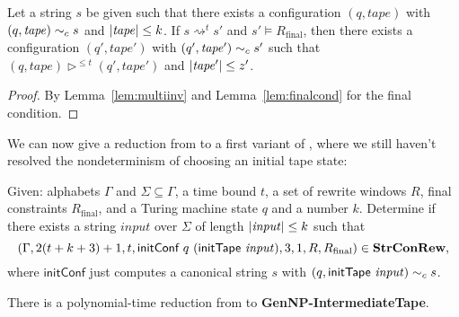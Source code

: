 \documentclass[a4paper,UKenglish,cleveref, autoref]{lipics-v2019}
\newcommand{\TODO}[1]{\ifthenelse{\isundefined{\showTODOs}}{}{\colorbox{red}{\LARGE TODO}:#1}}
\newcommand{\strent}{\rightsquigarrow}
\newcommand{\Rfinal}{R_{\text{final}}}
\begin{document}
  

\begin{theorem}[Soundness]\label{thm:simsound}
  Let a string $s$ be given such that there exists a configuration $(q, \mathit{tape})$ with $(q, \mathit{tape}) \sim_c{} s$ and $|\mathit{tape}| \le k$. If $s \strent^t s'$ and $s' \models \Rfinal$, then there exists a configuration $(q', \mathit{tape}')$ with $(q', \mathit{tape}') \sim_c{} s'$ such that $(q, \mathit{tape}) \rhd^{\le t} (q', \mathit{tape}')$ and $|\mathit{tape}'| \le z'$. 
\end{theorem}
\begin{proof}
  By Lemma~\ref{lem:multiinv} and Lemma~\ref{lem:finalcond} for the final condition.
\end{proof}

We can now give a reduction from \gennp{} to a first variant of \strconrew{}, where we still haven't resolved the nondeterminism of choosing an initial tape state:
\begin{definition}\label{def:gennpinter}
  Given: alphabets $\Gamma$ and $\Sigma \subseteq \Gamma$, a time bound $t$, a set of rewrite windows $R$, final constraints $\Rfinal$, and a Turing machine state $q$ and a number $k$. 
  Determine if there exists a string $\mathit{input}$ over $\Sigma$ of length $|\mathit{input}| \le k$ such that 
  \[(\Gamma, 2 (t + k + 3) + 1, t, \textsf{initConf}~q~(\textsf{initTape}~\mathit{input}), 3, 1, R, \Rfinal) \in \strconrew{},\]
  where $\textsf{initConf}$ just computes a canonical string $s$ with $(q, \textsf{initTape}~\mathit{input}) \sim_c{} s$. 
\end{definition}
\begin{theorem}
  There is a polynomial-time reduction from \gennp{} to \textbf{GenNP-IntermediateTape}. 
\end{theorem}
\end{document}
